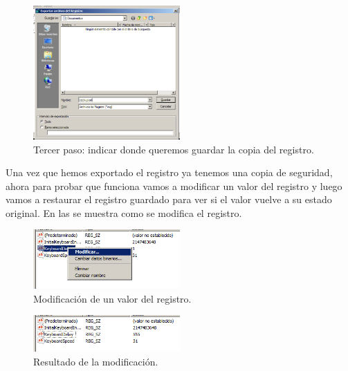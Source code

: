\begin{figure}[H]
  \begin{center}
    \includegraphics[width=0.5\textwidth]{imagenes/3}
    \caption{Tercer paso: indicar donde queremos guardar la copia del registro.}
    \label{fig3}
  \end{center}
\end{figure}

Una vez que hemos exportado el registro ya tenemos una copia de seguridad, ahora para probar que funciona vamos a modificar un valor del registro y luego vamos a restaurar el registro guardado para ver si el valor vuelve a su estado original. En las  se muestra como se modifica el registro.

\begin{figure}[H]
  \begin{center}
    \includegraphics[width=0.5\textwidth]{imagenes/4}
    \caption{Modificación de un valor del registro.}
    \label{fig4}
  \end{center}
\end{figure}

\begin{figure}[H]
  \begin{center}
    \includegraphics[width=0.5\textwidth]{imagenes/5}
    \caption{Resultado de la modificación.}
    \label{fig5}
  \end{center}
\end{figure}

